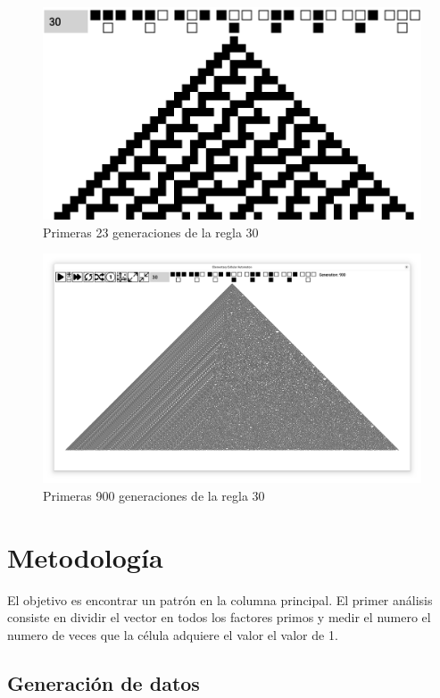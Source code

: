 \documentclass[12pt,twoside]{article}
\begin{document}
	\begin{figure}[H]
		\centering
		\includegraphics[width=\textwidth]{img/r30_1.png}
		\caption{Primeras 23 generaciones de la regla 30}
		\label{img:r30_1}
	\end{figure}
	
	\begin{figure}[H]
		\centering
		\includegraphics[width=\textwidth]{img/r30_2.png}
		\caption{Primeras 900 generaciones de la regla 30}
		\label{img:r30_2}
	\end{figure}
	
	\section{Metodología}
	
	El objetivo es encontrar un patrón en la columna principal. El primer análisis consiste en dividir el vector en todos los factores primos y medir el numero el numero de veces que la célula adquiere el valor el valor de 1.
	
	\subsection{Generación de datos}
	
\end{document}
